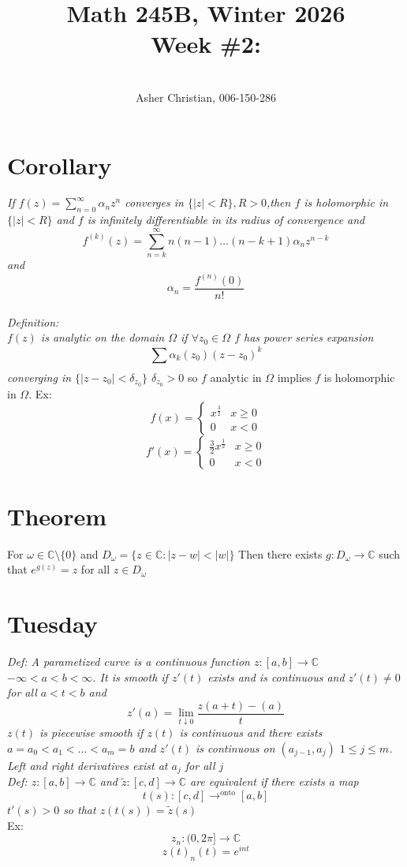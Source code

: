 \documentclass[11pt]{article}
\newcommand{\cnum}{Math 245B}
\newcommand{\ced}{Winter 2026}
\newcommand{\ctitle}[4]{\title{\vspace{-0.5in}\cnum, \ced\\Week #1: #2}\author{\vspace{-0.35in}\\#3, #4}}
\begin{document}
\ctitle{\#2}{}{Asher Christian}{006-150-286}
\date{}
\maketitle
\section{Corollary}
\emph{
    If $f(z) = \sum_{n=0}^{\infty}\alpha_n z^{n}$ converges in $\{|z| < R\}, R > 0$,then
    $f$ is holomorphic in $\{|z| < R\}$ and  $f$ is infinitely differentiable in its radius of convergence and
    \[
    f^{(k)}(z) = \sum_{n=k}^{\infty}n(n-1)\dots(n-k+1)\alpha_nz^{n-k}
    \] 
    and
    \[
    \alpha_n = \frac{f^{(n)}(0)}{n!}
    \]  
}\\
\emph{
    Definition:\\
    $f(z)$ is analytic on the domain  $\Omega$ if $\forall z_0 \in \Omega$ $f$ has power series expansion
    \[
    \sum_{}^{}\alpha_k(z_0)(z-z_0)^{k}
    \] 
    converging in $\{|z-z_0| < \delta_{z_0}\}$ $\delta_{z_0} > 0$
}
so $f$ analytic in $\Omega$ implies  $f$ is holomorphic in $\Omega$.
Ex: 
 \[
f(x) =
\begin{cases}
    x^{\frac{3}{2}} & x \ge 0 \\
    0 & x < 0
\end{cases}
\] 
\[
f'(x) = 
\begin{cases}
    \frac{3}{2}x^{\frac{1}{2}} & x \ge 0\\
    0 & x < 0
\end{cases}
\] 

\section{Theorem}
For $\omega \in \mathbb{C}\setminus \{0\}$ and $D_{\omega} = \{z \in \mathbb{C}: |z-w| < |w|\}$
Then there exists $g : D_\omega \rightarrow \mathbb{C}$ such that $e^{g(z)} = z$  for all $z \in D_\omega$

\section{Tuesday}
\emph{
    Def: A parametized curve is a continuous function $z : [a,b] \rightarrow \mathbb{C}$ $-\infty < a < b < \infty$.
    It is smooth if $z'(t)$ exists and is continuous and $z'(t) \ne 0$ for all  $a < t < b$ and
     \[
    z'(a) = \lim_{t\downarrow 0} \frac{z(a+t) - (a)}{t}
    \] 
    $z(t)$ is piecewise smooth if  $z(t)$ is continuous and there exists  $a = a_0 < a_1 < \dots < a_m = b$ and
    $z'(t)$ is continuous on  $(a_{j-1},a_j)$  $1 \le j \le m$. Left and right derivatives exist at  $a_j$ for all  $j$
}
\\
\emph{
    Def: $z : [a,b] \rightarrow \mathbb{C}$ and $\tilde z: [c,d] \rightarrow \mathbb{C}$ are equivalent
    if there exists a map 
    \[
        t(s) : [c,d] \rightarrow^{\text{onto}} [a,b]
    \] 
    $t'(s) > 0$ so that  $z(t(s)) = \tilde z(s)$
}
\\
Ex:
\[
    z_n : (0,2\pi] \rightarrow \mathbb{C}
\] 
\[
z(t)_n(t) = e^{int}
\] 
\end{document}
